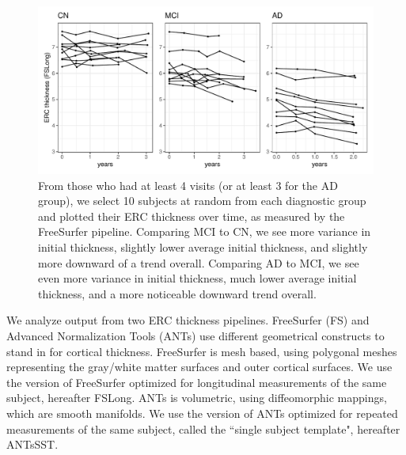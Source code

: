 \documentclass[12pt]{article}
\begin{document}
\begin{figure}[H]
\centering
\includegraphics[width=\linewidth]{figures/profiles_by_diagnosis}
\caption{From those who had at least 4 visits (or at least 3 for the AD group), we select 10 subjects at random from each diagnostic group and plotted their ERC thickness over time, as measured by the FreeSurfer pipeline. Comparing MCI to CN, we see more variance in initial thickness, slightly lower average initial thickness, and slightly more downward of a trend overall. Comparing AD to MCI, we see even more variance in initial thickness, much lower average initial thickness, and a more noticeable downward trend overall.} 
\end{figure}

We analyze output from two ERC thickness pipelines. FreeSurfer (FS) \citep{fischl2012freesurfer} and Advanced Normalization Tools (ANTs) \citep{avants2009advanced} use different geometrical constructs to stand in for cortical thickness. FreeSurfer is mesh based, using polygonal meshes representing the gray/white matter surfaces and outer cortical surfaces. We use the version of FreeSurfer optimized for longitudinal measurements of the same subject, hereafter FSLong. ANTs is volumetric, using diffeomorphic mappings, which are smooth manifolds. We use the version of ANTs optimized for repeated measurements of the same subject, called the ``single subject template", hereafter ANTsSST. 
\end{document}
